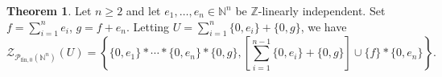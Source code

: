 \documentclass{report}
\newcommand{\NN}{\mathbb{N}}
\renewcommand{\P}{\mathcal{P}}
\newcommand{\ZZ}{\mathbb{Z}}
\newcommand{\Z}{\mathcal{Z}}
\newcommand{\llb}{\llbracket}
\newcommand{\rrb}{\rrbracket}
\newcommand{\fon}{{\textrm{fin}, 0}}
\renewcommand{\:}{\text{:}}
\theoremstyle{definition}
\newtheorem{thm}[defn]{Theorem}
\begin{document}



\begin{thm} \label{thm:2n-length-set}
Let $n\ge 2$ and let $e_1,\dots, e_n\in \NN^n$ be $\ZZ$-linearly independent.
Set $f = \sum_{i=1}^n e_i$, $g=f+e_n$.
Letting $U = \sum_{i=1}^n \{0,e_i\} + \{0,g\}$, we have 
\[\Z_{\P_\fon(\NN^n)}(U) = \left\{ \{0,e_1\}*\cdots*\{0,e_n\}*\{0,g\}, \left[\sum_{i=1}^{n-1}\{0,e_i\}+\{0,g\}\right]\cup\{f\} * \{0,e_n\} \right\}. \]
\end{thm}
\end{document}
